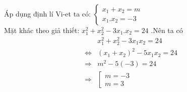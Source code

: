 \begin{enumerate}[1.]
\begin{enumerate}[a.]
Áp dụng định lí Vi-et ta có: $\left\{ {\begin{array}{*{20}{c}}
  {{x_1} + {x_2} = m} \\ 
  {{x_1}.{x_2} =  - 3} 
\end{array}} \right.$\\
Mặt khác theo giả thiết: $  x^{2}_{1} + x^{2}_{2} - 3x_{1}.x_{2} = 24$ .Nên ta có
\begin{align*}
  &x_1^2 + x_2^2 - 3{x_1}{x_2} = 24  \\
   \Leftrightarrow& {\left( {{x_1} + {x_2}} \right)^2} - 5{x_1}{x_2} = 24 \\
   \Rightarrow &{m^2} - 5( - 3) = 24 \\
   \Rightarrow &\left[ {\begin{array}{*{20}{c}}
  {m =  - 3} \\ 
  {m = 3} 
\end{array}} \right. \\ 
\end{align*} 
\end{enumerate}
\end{enumerate}


